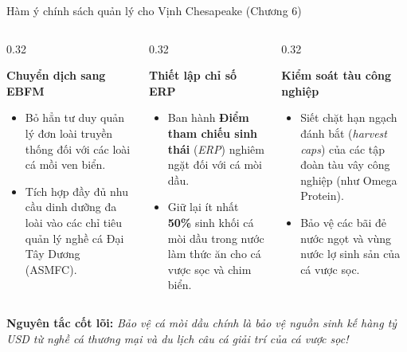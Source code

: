 \documentclass[aspectratio=169, 10pt]{beamer}
\begin{document}
\begin{frame}{Hàm ý chính sách quản lý cho Vịnh Chesapeake (Chương 6)}
  \begin{columns}[t]
    \begin{column}{0.32\textwidth}
      \begin{block}{\centering \textbf{Chuyển dịch sang EBFM}}
        \scriptsize
        \begin{itemize}
          \item Bỏ hẳn tư duy quản lý đơn loài truyền thống đối với các loài cá mồi ven biển.
          \item Tích hợp đầy đủ nhu cầu dinh dưỡng đa loài vào các chỉ tiêu quản lý nghề cá Đại Tây Dương (ASMFC).
        \end{itemize}
      \end{block}
    \end{column}

    \begin{column}{0.32\textwidth}
      \begin{block}{\centering \textbf{Thiết lập chỉ số ERP}}
        \scriptsize
        \begin{itemize}
          \item Ban hành \textbf{Điểm tham chiếu sinh thái} (\textit{ERP}) nghiêm ngặt đối với cá mòi dầu.
          \item Giữ lại ít nhất \textbf{50\%} sinh khối cá mòi dầu trong nước làm thức ăn cho cá vược sọc và chim biển.
        \end{itemize}
      \end{block}
    \end{column}

    \begin{column}{0.32\textwidth}
      \begin{block}{\centering \textbf{Kiểm soát tàu công nghiệp}}
        \scriptsize
        \begin{itemize}
          \item Siết chặt hạn ngạch đánh bắt (\textit{harvest caps}) của các tập đoàn tàu vây công nghiệp (như Omega Protein).
          \item Bảo vệ các bãi đẻ nước ngọt và vùng nước lợ sinh sản của cá vược sọc.
        \end{itemize}
      \end{block}
    \end{column}
  \end{columns}

  \vspace{0.25cm}
  \begin{alertblock}{\centering \textbf{Nguyên tắc cốt lõi:}}
    \centering \footnotesize \textit{Bảo vệ cá mòi dầu chính là bảo vệ nguồn sinh kế hàng tỷ USD từ nghề cá thương mại và du lịch câu cá giải trí của cá vược sọc!}
  \end{alertblock}
\end{frame}
\end{document}
